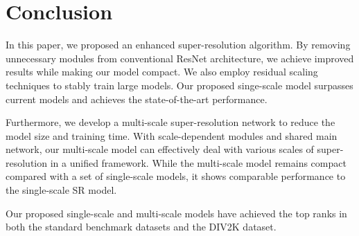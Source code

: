 \documentclass[10pt,twocolumn,letterpaper]{article}
\begin{document}
	\section{Conclusion}
	
	In this paper, we proposed an enhanced super-resolution algorithm. By removing unnecessary modules from conventional ResNet architecture, we achieve improved results while making our model compact. We also employ residual scaling techniques to stably train large models. Our proposed singe-scale model surpasses current models and achieves the state-of-the-art performance.
	
	Furthermore, we develop a multi-scale super-resolution network to reduce the model size and training time.
	With scale-dependent modules and shared main network, our multi-scale model can effectively deal with various scales of super-resolution in a unified framework. While the multi-scale model remains compact compared with a set of single-scale models, it shows comparable performance to the single-scale SR model.

	Our proposed single-scale and multi-scale models have achieved the top ranks in both the standard benchmark datasets and the DIV2K dataset.
	
{\small
		
		
	}
	
\end{document}
